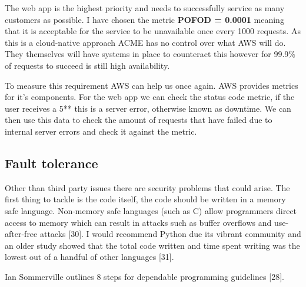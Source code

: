   The web app is the highest priority and needs to successfully service as many customers as possible.
  I have chosen the metric \textbf{POFOD = 0.0001} meaning that it is acceptable for the service to be unavailable once every 1000 requests. As this is a 
  cloud-native approach ACME has no control over what AWS will do. They themselves will have systems in place to counteract this however for 99.9\% of
  requests to succeed is still high availability.

  To measure this requirement AWS can help us once again. AWS provides metrics for it's components. For the web app we can check the status code
  metric, if the user receives a 5** this is a server error, otherwise known as downtime. We can then use this data to check the amount of requests that 
  have failed due to internal server errors and check it against the metric.

  \subsection{Fault tolerance}
  Other than third party issues there are security problems that could arise. The first thing to tackle is the code itself, the code should be written in 
  a memory safe language. Non-memory safe languages (such as C) allow programmers direct access to memory which can result in attacks such as buffer
  overflows and use-after-free attacks [30]. I would recommend Python due its vibrant community and an older study showed
  that the total code written and time spent writing was the lowest out of a handful of other languages [31].

  Ian Sommerville outlines 8 steps for dependable programming guidelines [28].

